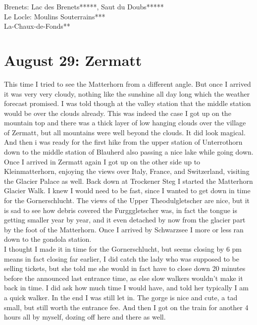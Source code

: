 Brenets: Lac des Brenets*****, Saut du Doubs*****\\
Le Locle: Moulins Souterrains***\\
La-Chaux-de-Fonds**

\section{August 29: Zermatt}
\label{Zermatt2010}

This time I tried to see the Matterhorn from a different angle. But once I arrived it was very very cloudy, nothing like the sunshine all day long which the weather forecast promised. I was told though at the valley station that the middle station would be over the clouds already. This was indeed the case I got up on the mountain top and there was a thick layer of low hanging clouds over the village of Zermatt, but all mountains were well beyond the clouds. It did look magical. And then i was ready for the first hike from the upper station of Unterrothorn down to the middle station of Blauherd also passing a nice lake while going down. \\

Once I arrived in Zermatt again I got up on the other side up to Kleinmatterhorn, enjoying the views over Italy, France, and Switzerland, visiting the Glacier Palace as well. Back down at Trockener Steg I started the Matterhorn Glacier Walk. I knew I would need to be fast, since I wanted to get down in time for the Gornerschlucht. The views of the Upper Theodulgletscher are nice, but it is sad to see how debris covered the Furgggletscher was, in fact the tongue is getting smaller year by year, and it even detached by now from the glacier part by the foot of the Matterhorn. Once I arrived by Schwarzsee I more or less ran down to the gondola station.\\

I thought I made it in time for the Gornerschlucht, but seems closing by 6 pm means in fact closing far earlier, I did catch the lady who was supposed to be selling tickets, but she told me she would in fact have to close down 20 minutes before the announced last entrance time, as else slow walkers wouldn't make it back in time. I did ask how much time I would have, and told her typically I am a quick walker. In the end I was still let in. The gorge is nice and cute, a tad small, but still worth the entrance fee. And then I got on the train for another 4 hours all by myself, dozing off here and there as well.\\

